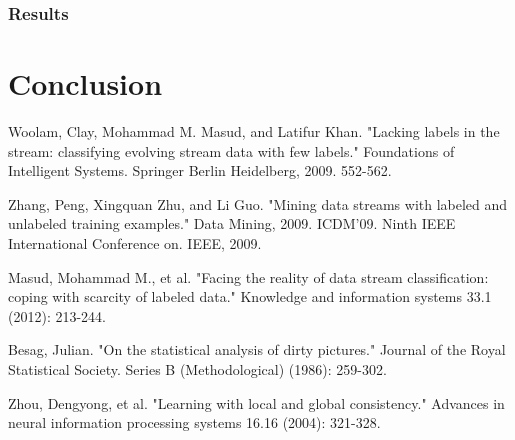 \documentclass[12pt,a4paper,oneside]{report}
\begin{document}
\subsubsection{Results}
\section{Conclusion}
\begin{thebibliography}{20}

Woolam, Clay, Mohammad M. Masud, and Latifur Khan. "Lacking labels in the stream: classifying evolving stream data with few labels." Foundations of Intelligent Systems. Springer Berlin Heidelberg, 2009. 552-562.

Zhang, Peng, Xingquan Zhu, and Li Guo. "Mining data streams with labeled and unlabeled training examples." Data Mining, 2009. ICDM'09. Ninth IEEE International Conference on. IEEE, 2009.

Masud, Mohammad M., et al. "Facing the reality of data stream classification: coping with scarcity of labeled data." Knowledge and information systems 33.1 (2012): 213-244.

Besag, Julian. "On the statistical analysis of dirty pictures." Journal of the Royal Statistical Society. Series B (Methodological) (1986): 259-302.

Zhou, Dengyong, et al. "Learning with local and global consistency." Advances in neural information processing systems 16.16 (2004): 321-328.

\end{thebibliography}
\end{document}
